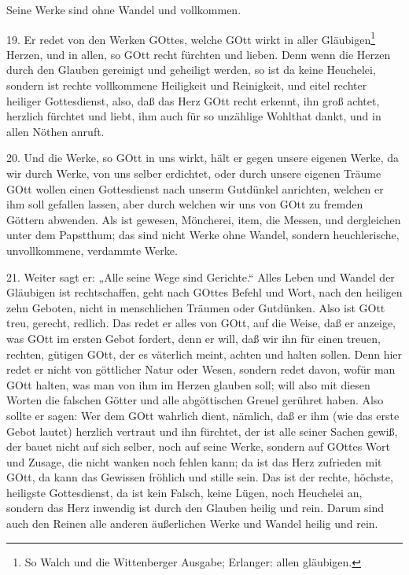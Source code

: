 \begin{schriftzitat}
Seine Werke sind ohne Wandel und vollkommen.
\end{schriftzitat}

19. Er redet von den Werken GOttes, welche GOtt wirkt in aller Gläubigen\footnote{So Walch und die Wittenberger Ausgabe; Erlanger: allen gläubigen.} Herzen, und in allen, so GOtt recht fürchten und lieben. Denn wenn die Herzen durch den Glauben gereinigt und geheiligt werden, so ist da keine Heuchelei, sondern ist rechte vollkommene Heiligkeit und Reinigkeit, und eitel rechter heiliger Gottesdienst, also, daß das Herz GOtt recht erkennt, ihn groß achtet, herzlich fürchtet und liebt, ihm auch für so unzählige Wohlthat dankt, und in allen Nöthen anruft.

20. Und die Werke, so GOtt in uns wirkt, hält er gegen unsere eigenen Werke, da wir durch Werke, von uns selber erdichtet, oder durch unsere eigenen Träume GOtt wollen einen Gottesdienst nach unserm Gutdünkel anrichten, welchen er ihm soll gefallen lassen, aber durch welchen wir uns von GOtt zu fremden Göttern abwenden. Als ist gewesen, Möncherei, item, die Messen, und dergleichen unter dem Papstthum; das sind nicht Werke ohne Wandel, sondern heuchlerische, unvollkommene, verdammte Werke.

21. Weiter sagt er: „Alle seine Wege sind Gerichte.“ Alles Leben und Wandel der Gläubigen ist rechtschaffen, geht nach GOttes Befehl und Wort, nach den heiligen zehn Geboten, nicht in menschlichen Träumen oder Gutdünken. Also ist GOtt treu, gerecht, redlich. Das redet er alles von GOtt, auf die Weise, daß er anzeige, was GOtt im ersten Gebot fordert, denn er will, daß wir ihn für einen treuen, rechten, gütigen GOtt, der es väterlich meint, achten und halten sollen. Denn hier redet er nicht von göttlicher Natur oder Wesen, sondern redet davon, wofür man GOtt halten, was man von ihm im Herzen glauben soll; will also mit diesen Worten die falschen Götter und alle abgöttischen Greuel gerühret haben. Also sollte er sagen: Wer dem GOtt wahrlich dient, nämlich, daß er ihm (wie das erste Gebot lautet) herzlich vertraut und ihn fürchtet, der ist alle seiner Sachen gewiß, der bauet nicht auf sich selber, noch auf seine Werke, sondern auf GOttes Wort und Zusage, die nicht wanken noch fehlen kann; da ist das Herz zufrieden mit GOtt, da kann das Gewissen fröhlich und stille sein. Das ist der rechte, höchste, heiligste Gottesdienst, da ist kein Falsch, keine Lügen, noch Heuchelei an, sondern das Herz inwendig ist durch den Glauben heilig und rein. Darum sind auch den Reinen alle anderen äußerlichen Werke und Wandel heilig und rein.

